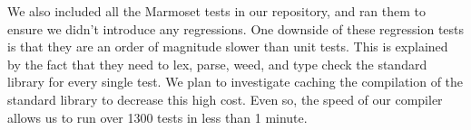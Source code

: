 \documentclass[12pt, titlepage]{article}
\begin{document}
We also included all the Marmoset tests in our repository, and ran them to
ensure we didn't introduce any regressions. One downside of these regression
tests is that they are an order of magnitude slower than unit tests. This is
explained by the fact that they need to lex, parse, weed, and type check the
standard library for every single test. We plan to investigate caching the
compilation of the standard library to decrease this high cost. Even so, the
speed of our compiler allows us to run over 1300 tests in less than 1 minute.
\end{document}
